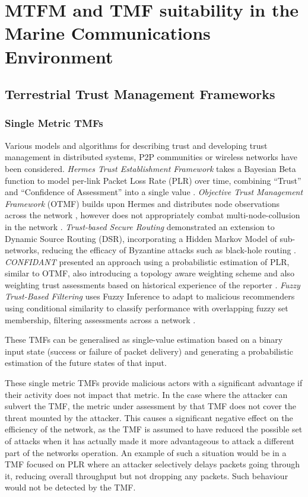 \documentclass[conference]{IEEEtran}
\begin{document}
\section{MTFM and TMF suitability in the Marine Communications Environment}\label{sec:mtfm}



\subsection{Terrestrial Trust Management Frameworks}

\subsubsection{Single Metric TMFs}

Various models and algorithms for describing trust and developing trust management in distributed systems, P2P communities or wireless networks have been considered.
\emph{Hermes Trust Establishment Framework} takes a Bayesian Beta function to model per-link Packet Loss Rate (PLR) over time, combining ``Trust'' and ``Confidence of Assessment'' into a single value \cite{Zouridaki2005}.
\emph{Objective Trust Management Framework} (OTMF) builds upon Hermes and distributes node observations across the network \cite{Li2008}, however does not appropriately combat multi-node-collusion in the network \cite{Cho2011}.
\emph{Trust-based Secure Routing} demonstrated an extension to Dynamic Source Routing (DSR), incorporating a Hidden Markov Model of sub-networks, reducing the efficacy of Byzantine attacks such as black-hole routing  \cite{Moe2008a}.
\emph{CONFIDANT} presented an approach using a probabilistic estimation of PLR, similar to OTMF, also introducing a topology aware weighting scheme and also weighting trust assessments based on historical experience of the reporter \cite{Buchegger2002}.
\emph{Fuzzy Trust-Based Filtering} uses Fuzzy Inference to adapt to malicious recommenders using conditional similarity to classify performance with overlapping fuzzy set membership, filtering assessments across a network \cite{Luo2008}. 

These TMFs can be generalised as single-value estimation based on a binary input state (success or failure of packet delivery) and generating a probabilistic estimation of the future states of that input. 

These single metric TMFs provide malicious actors with a significant advantage if their activity does not impact that metric.
In the case where the attacker can subvert the TMF, the metric under assessment by that TMF does not cover the threat mounted by the attacker.
This causes a significant negative effect on the efficiency of the network, as the TMF is assumed to have reduced the possible set of attacks when it has actually made it more advantageous to attack a different part of the networks operation.
An example of such a situation would be in a TMF focused on PLR where an attacker selectively delays packets going through it, reducing overall throughput but not dropping any packets.
Such behaviour would not be detected by the TMF.
\end{document}
